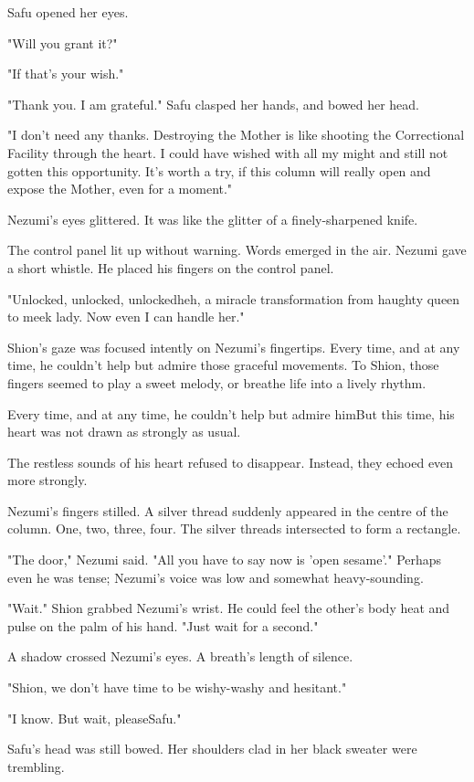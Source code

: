 Safu opened her eyes.

"\el Will you grant it?"

"If that's your wish."

"Thank you. I am grateful." Safu clasped her hands, and bowed her head.

"I don't need any thanks. Destroying the Mother is like shooting the
Correctional Facility through the heart. I could have wished with all my
might and still not gotten this opportunity. It's worth a try, if this
column will really open and expose the Mother, even for a moment."

Nezumi's eyes glittered. It was like the glitter of a finely-sharpened
knife.

The control panel lit up without warning. Words emerged in the air.
Nezumi gave a short whistle. He placed his fingers on the control panel.

"Unlocked, unlocked, unlocked\el heh, a miracle transformation from
haughty queen to meek lady. Now even I can handle her."

Shion's gaze was focused intently on Nezumi's fingertips. Every time,
and at any time, he couldn't help but admire those graceful movements.
To Shion, those fingers seemed to play a sweet melody, or breathe life
into a lively rhythm.

Every time, and at any time, he couldn't help but admire him\el But
this time, his heart was not drawn as strongly as usual.

The restless sounds of his heart refused to disappear. Instead, they
echoed even more strongly.

Nezumi's fingers stilled. A silver thread suddenly appeared in the
centre of the column. One, two, three, four. The silver threads
intersected to form a rectangle.

"The door," Nezumi said. "All you have to say now is 'open sesame'."
Perhaps even he was tense; Nezumi's voice was low and somewhat
heavy-sounding.

"Wait." Shion grabbed Nezumi's wrist. He could feel the other's body
heat and pulse on the palm of his hand. "Just wait for a second."

A shadow crossed Nezumi's eyes. A breath's length of silence.

"Shion, we don't have time to be wishy-washy and hesitant."

"I know. But wait, please\el Safu."

Safu's head was still bowed. Her shoulders clad in her black sweater
were trembling.

